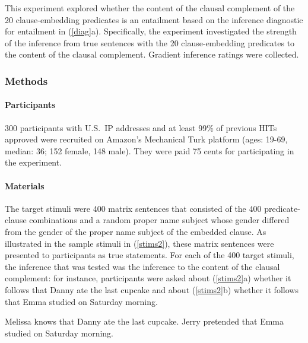 \documentclass[11pt,fleqn]{article}
\newcommand{\6}{\mbox{$[\hspace*{-.6mm}[$}}
\newcommand{\9}{\mbox{$]\hspace*{-.6mm}]$}}
\begin{document}
This experiment explored whether the content of the clausal complement of the 20 clause-embedding predicates is an entailment based on the inference diagnostic for entailment in (\ref{diag}a). Specifically, the experiment investigated the strength of the inference from true sentences with the 20 clause-embedding predicates to the content of the clausal complement. Gradient inference ratings were collected.


\subsubsection{Methods}

\paragraph{Participants} 300 participants with U.S.\ IP addresses and at least 99\% of previous HITs approved were recruited on Amazon's Mechanical Turk platform (ages: 19-69, median: 36; 152 female, 148 male). They were paid 75 cents for participating in the experiment.

\paragraph{Materials} The target stimuli were 400 matrix sentences that consisted of the 400 predicate-clause combinations and a random proper name subject whose gender differed from the gender of the proper name subject of the embedded clause. As illustrated in the sample stimuli in (\ref{stims2}), these matrix sentences were presented to participants as true statements. For each of the 400 target stimuli, the inference that was tested was the inference to the content of the clausal complement: for instance, participants were asked about (\ref{stims2}a) whether it follows that Danny ate the last cupcake and about (\ref{stims2}b) whether it follows that Emma studied on Saturday morning.

\begin{exe}
\ex\label{stims2}
\begin{xlist}
 Melissa knows that Danny ate the last cupcake.
 Jerry pretended that Emma studied on Saturday morning.
\end{xlist}
\end{exe}
\end{document}
